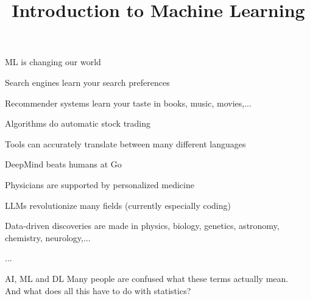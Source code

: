 \documentclass[11pt,compress,t,notes=noshow, xcolor=table]{beamer}
\title{Introduction to Machine Learning}
\begin{document}


\begin{framei}{ML is changing our world}
\item Search engines learn your search preferences
\item Recommender systems learn your taste in books, music, movies,...
\item Algorithms do automatic stock trading
\item Tools can accurately translate between many different languages  
\item DeepMind beats humans at Go
\item Physicians are supported by personalized medicine
\item LLMs revolutionize many fields (currently especially coding)
\item Data-driven discoveries are made in physics, biology, genetics, 
  astronomy, chemistry, neurology,...
\item ...

\end{framei}


\begin{frame}{AI, ML and DL}
\lz
Many people are confused what these terms actually mean.\\
\lz
And what does all this have to do with statistics?
\end{frame}
\end{document}

